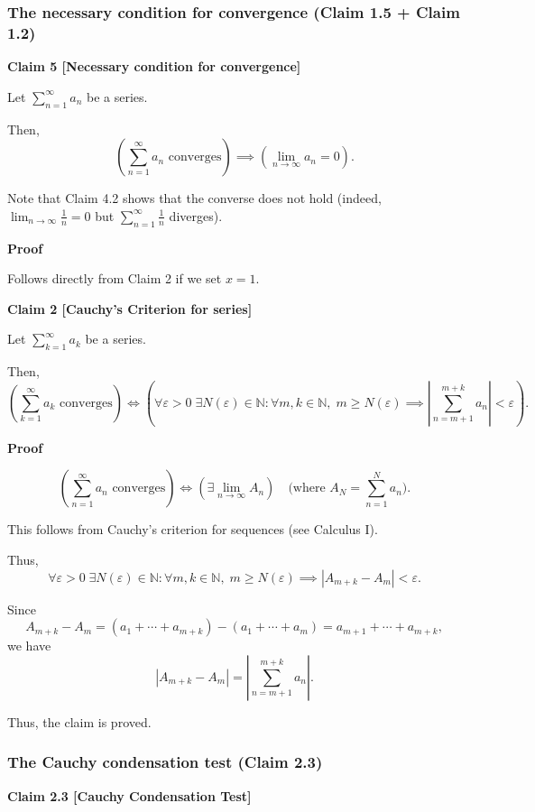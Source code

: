 \subsubsection{The necessary condition for convergence (Claim 1.5 + Claim 1.2)}
\textbf{Claim 5 [Necessary condition for convergence]} 

Let $\sum_{n=1}^\infty a_n$ be a series. 

Then, 
\[
\left( \sum_{n=1}^\infty a_n \text{ converges} \right) \implies \left( \lim_{n \to \infty} a_n = 0 \right).
\]

Note that Claim 4.2 shows that the converse does not hold (indeed, $\lim_{n \to \infty} \frac{1}{n} = 0$ but $\sum_{n=1}^\infty \frac{1}{n}$ diverges).

\textbf{Proof}

Follows directly from Claim 2 if we set $x = 1$.

\bigskip

\textbf{Claim 2 [Cauchy’s Criterion for series]} 

Let $\sum_{k=1}^\infty a_k$ be a series.

Then,
\[
\left( \sum_{k=1}^\infty a_k \text{ converges} \right) \iff \left( \forall \varepsilon > 0 \; \exists N(\varepsilon) \in \mathbb{N} : \forall m, k \in \mathbb{N}, \; m \geq N(\varepsilon) \implies \left| \sum_{n=m+1}^{m+k} a_n \right| < \varepsilon \right).
\]

\textbf{Proof}

\[
\left( \sum_{n=1}^\infty a_n \text{ converges} \right) \iff \left( \exists \lim_{n \to \infty} A_n \right) \quad \text{(where } A_N = \sum_{n=1}^N a_n \text{)}.
\]

This follows from Cauchy’s criterion for sequences (see Calculus I). 

Thus,
\[
\forall \varepsilon > 0 \; \exists N(\varepsilon) \in \mathbb{N} : \forall m, k \in \mathbb{N}, \; m \geq N(\varepsilon) \implies \left| A_{m+k} - A_m \right| < \varepsilon.
\]

Since 
\[
A_{m+k} - A_m = \left( a_1 + \cdots + a_{m+k} \right) - \left( a_1 + \cdots + a_m \right) = a_{m+1} + \cdots + a_{m+k},
\]
we have 
\[
\left| A_{m+k} - A_m \right| = \left| \sum_{n=m+1}^{m+k} a_n \right|.
\]

Thus, the claim is proved.

\subsubsection{The Cauchy condensation test (Claim 2.3)}
\textbf{Claim 2.3 [Cauchy Condensation Test]}


